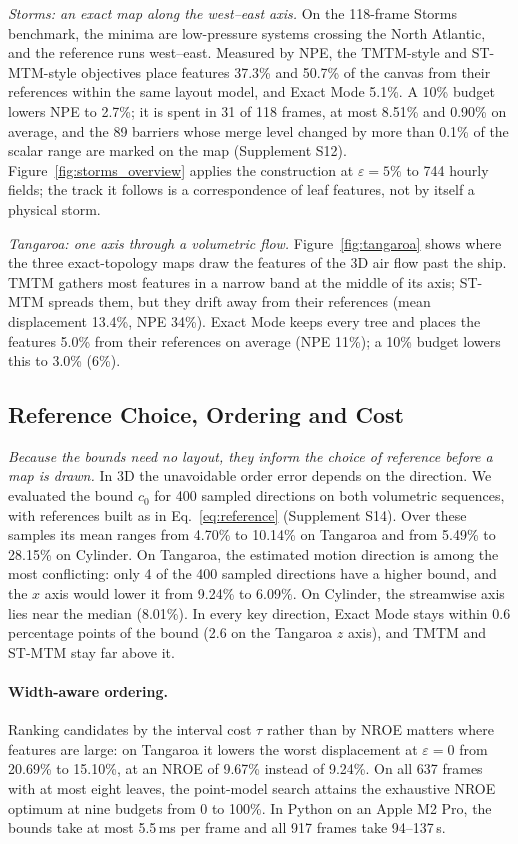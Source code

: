 \documentclass[review]{vgtc}
\begin{document}
\emph{Storms: an exact map along the west--east axis.} On the 118-frame Storms benchmark, the minima are low-pressure systems crossing the North Atlantic, and the reference runs west--east. Measured by NPE, the TMTM-style and ST-MTM-style objectives place features 37.3\% and 50.7\% of the canvas from their references within the same layout model, and Exact Mode 5.1\%. A 10\% budget lowers NPE to 2.7\%; it is spent in 31 of 118 frames, at most 8.51\% and 0.90\% on average, and the 89 barriers whose merge level changed by more than 0.1\% of the scalar range are marked on the map (Supplement S12). Figure~\ref{fig:storms_overview} applies the construction at $\varepsilon=5\%$ to 744 hourly fields; the track it follows is a correspondence of leaf features, not by itself a physical storm.

\emph{Tangaroa: one axis through a volumetric flow.} Figure~\ref{fig:tangaroa} shows where the three exact-topology maps draw the features of the 3D air flow past the ship. TMTM gathers most features in a narrow band at the middle of its axis; ST-MTM spreads them, but they drift away from their references (mean displacement 13.4\%, NPE 34\%). Exact Mode keeps every tree and places the features 5.0\% from their references on average (NPE 11\%); a 10\% budget lowers this to 3.0\% (6\%).

\subsection{Reference Choice, Ordering and Cost}\label{sec:ablation}
\emph{Because the bounds need no layout, they inform the choice of reference before a map is drawn.} In 3D the unavoidable order error depends on the direction. We evaluated the bound $c_0$ for 400 sampled directions on both volumetric sequences, with references built as in Eq.~\ref{eq:reference} (Supplement S14). Over these samples its mean ranges from 4.70\% to 10.14\% on Tangaroa and from 5.49\% to 28.15\% on Cylinder. On Tangaroa, the estimated motion direction is among the most conflicting: only 4 of the 400 sampled directions have a higher bound, and the $x$ axis would lower it from 9.24\% to 6.09\%. On Cylinder, the streamwise axis lies near the median (8.01\%). In every key direction, Exact Mode stays within 0.6 percentage points of the bound (2.6 on the Tangaroa $z$ axis), and TMTM and ST-MTM stay far above it.

\paragraph{Width-aware ordering.} Ranking candidates by the interval cost $\tau$ rather than by NROE matters where features are large: on Tangaroa it lowers the worst displacement at $\varepsilon=0$ from 20.69\% to 15.10\%, at an NROE of 9.67\% instead of 9.24\%. On all 637 frames with at most eight leaves, the point-model search attains the exhaustive NROE optimum at nine budgets from 0 to 100\%. In Python on an Apple M2 Pro, the bounds take at most 5.5\,ms per frame and all 917 frames take 94--137\,s.
\end{document}
